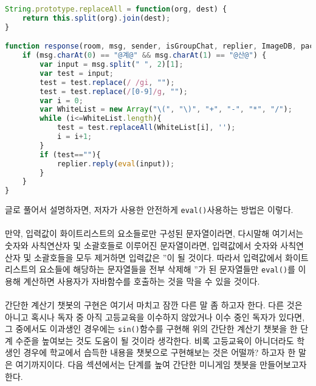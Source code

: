\documentclass[10pt,a4paper,final]{book}
\begin{document}
\begin{lstlisting}[language=JavaScript,escapeinside=@@]
String.prototype.replaceAll = function(org, dest) {
    return this.split(org).join(dest);
}

function response(room, msg, sender, isGroupChat, replier, ImageDB, packageName, threadId) {
    if (msg.charAt(0) == "@계@" && msg.charAt(1) == "@산@") {
        var input = msg.split(" ", 2)[1];
        var test = input;
        test = test.replace(/ /gi, "");
        test = test.replace(/[0-9]/g, "");
        var i = 0;
        var WhiteList = new Array("\(", "\)", "+", "-", "*", "/");
        while (i<=WhiteList.length){
            test = test.replaceAll(WhiteList[i], '');
            i = i+1;
        }
        if (test==""){
            replier.reply(eval(input));
        }
    }
}
\end{lstlisting}
글로 풀어서 설명하자면, 저자가 사용한 안전하게 \texttt{eval()}사용하는 방법은 이렇다.\\
\\
만약, 입력값이 화이트리스트의 요소들로만 구성된 문자열이라면,
다시말해 여기서는 숫자와 사칙연산자 및 소괄호들로 이루어진 문자열이라면,
입력값에서 숫자와 사칙연산자 및 소괄호들을 모두 제거하면 입력값은 ''이 될 것이다. 따라서
입력값에서 화이트리스트의 요소들에 해당하는 문자열들을 전부 삭제해 ''가 된 문자열들만
\texttt{eval()}를 이용해 계산하면 사용자가 자바함수를 호출하는 것을 막을 수 있을 것이다.\\
\\
간단한 계산기 챗봇의 구현은 여기서 마치고 잠깐 다른 말 좀 하고자 한다.
다른 것은 아니고 혹시나 독자 중 아직 고등교육을 이수하지 않았거나 이수 중인 독자가 있다면,
그 중에서도 이과생인 경우에는 \texttt{sin()}함수를 구현해 위의 간단한 계산기 챗봇을 한 단계
수준을 높여보는 것도 도움이 될 것이라 생각한다. 비록 고등교육이 아니더라도 학생인 경우에
학교에서 습득한 내용을 챗봇으로 구현해보는 것은 어떨까?
하고자 한 말은 여기까지이다. 다음 섹션에서는 단계를 높여 간단한 미니게임 챗봇을 만들어보고자 한다.
\end{document}
